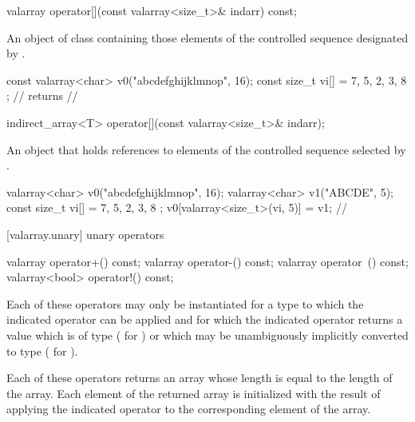 %
\begin{itemdecl}
valarray operator[](const valarray<size_t>& indarr) const;
\end{itemdecl}

\begin{itemdescr}
\pnum
\returns An object of class  containing those
elements of the controlled sequence designated by .
\begin{example}
\begin{codeblock}
const valarray<char> v0("abcdefghijklmnop", 16);
const size_t vi[] = { 7, 5, 2, 3, 8 };
//  returns
// 
\end{codeblock}
\end{example}
\end{itemdescr}

%
\begin{itemdecl}
indirect_array<T> operator[](const valarray<size_t>& indarr);
\end{itemdecl}

\begin{itemdescr}
\pnum
\returns An object that holds references to elements of the controlled
sequence selected by . \begin{example}
\begin{codeblock}
valarray<char> v0("abcdefghijklmnop", 16);
valarray<char> v1("ABCDE", 5);
const size_t vi[] = { 7, 5, 2, 3, 8 };
v0[valarray<size_t>(vi, 5)] = v1;
// 
\end{codeblock}
\end{example}
\end{itemdescr}

[valarray.unary]{ unary operators}

%
%
%
%
\begin{itemdecl}
valarray operator+() const;
valarray operator-() const;
valarray operator~() const;
valarray<bool> operator!() const;
\end{itemdecl}

\begin{itemdescr}
\pnum
Each of these operators may only be instantiated for a type 
to which the indicated operator can be applied and for which the indicated
operator returns a value which is of type  ( for
) or which may be unambiguously implicitly converted to type
 ( for ).

\pnum
Each of these operators returns an array whose length is equal to the length
of the array.
Each element of the returned array is initialized with the result of
applying the indicated operator to the corresponding element of the array.
\end{itemdescr}

